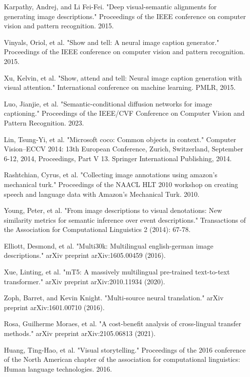\documentclass[runningheads]{llncs}
\begin{document}
\begin{thebibliography}{8}
Karpathy, Andrej, and Li Fei-Fei. "Deep visual-semantic alignments for generating image descriptions." Proceedings of the IEEE conference on computer vision and pattern recognition. 2015.

Vinyals, Oriol, et al. "Show and tell: A neural image caption generator." Proceedings of the IEEE conference on computer vision and pattern recognition. 2015.

Xu, Kelvin, et al. "Show, attend and tell: Neural image caption generation with visual attention." International conference on machine learning. PMLR, 2015.

Luo, Jianjie, et al. "Semantic-conditional diffusion networks for image captioning." Proceedings of the IEEE/CVF Conference on Computer Vision and Pattern Recognition. 2023.

Lin, Tsung-Yi, et al. "Microsoft coco: Common objects in context." Computer Vision–ECCV 2014: 13th European Conference, Zurich, Switzerland, September 6-12, 2014, Proceedings, Part V 13. Springer International Publishing, 2014.

Rashtchian, Cyrus, et al. "Collecting image annotations using amazon’s mechanical turk." Proceedings of the NAACL HLT 2010 workshop on creating speech and language data with Amazon’s Mechanical Turk. 2010.

Young, Peter, et al. "From image descriptions to visual denotations: New similarity metrics for semantic inference over event descriptions." Transactions of the Association for Computational Linguistics 2 (2014): 67-78.

Elliott, Desmond, et al. "Multi30k: Multilingual english-german image descriptions." arXiv preprint arXiv:1605.00459 (2016).

Xue, Linting, et al. "mT5: A massively multilingual pre-trained text-to-text transformer." arXiv preprint arXiv:2010.11934 (2020).

Zoph, Barret, and Kevin Knight. "Multi-source neural translation." arXiv preprint arXiv:1601.00710 (2016).

Rosa, Guilherme Moraes, et al. "A cost-benefit analysis of cross-lingual transfer methods." arXiv preprint arXiv:2105.06813 (2021).

Huang, Ting-Hao, et al. "Visual storytelling." Proceedings of the 2016 conference of the North American chapter of the association for computational linguistics: Human language technologies. 2016.


\end{thebibliography}
\end{document}
